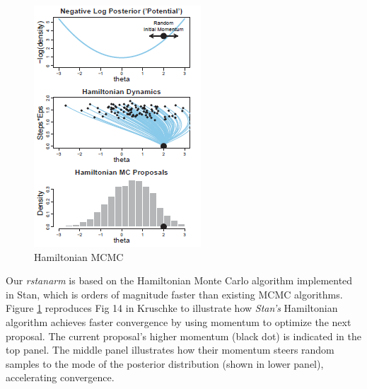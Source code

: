 \documentclass[11pt,notitlepage]{article}
\begin{document}
\begin{figure}
  \vspace{-15pt}
 \includegraphics[scale=0.85]{Figures/Hamiltonian.png}
  \vspace{-20pt}
  \caption{Hamiltonian MCMC}
    \label{fig:Hamiltonian}
 \vspace{- 30 pt}
\end{figure}

Our \textit{rstanarm} is based on the Hamiltonian Monte Carlo algorithm implemented in Stan, which is orders of magnitude faster than existing MCMC algorithms. Figure \ref{fig:Hamiltonian} reproduces Fig 14 in Kruschke \cite{Kruschke_Book_2014} to illustrate how \textit{Stan's} Hamiltonian algorithm achieves faster convergence by using momentum to optimize the next proposal. The current proposal's higher momentum (black dot) is indicated in the top panel. The middle panel illustrates how their momentum steers random samples to the mode of the posterior distribution (shown in lower panel), accelerating convergence. 
\end{document}
